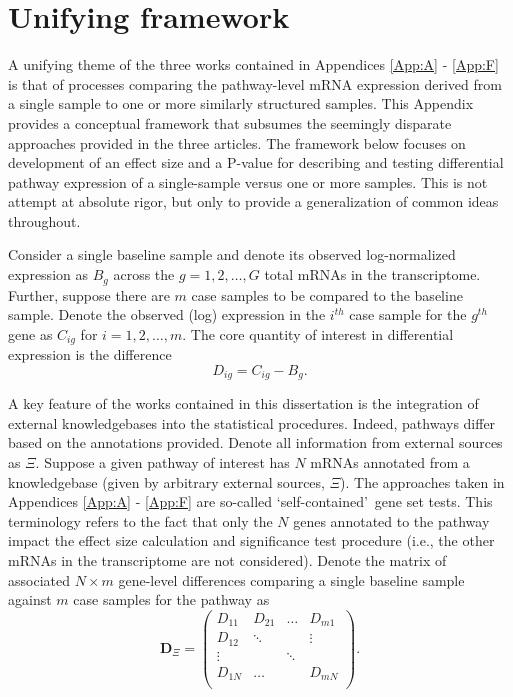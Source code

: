 \chapter{Unifying framework} \label{App:eqns}

\indent \indent A unifying theme of the three works contained in Appendices \ref{App:A} - \ref{App:F} is that of processes comparing the pathway-level mRNA expression derived from a single sample to one or more similarly structured samples. This Appendix provides a conceptual framework that subsumes the seemingly disparate approaches provided in the three articles. The framework below focuses on  development of an effect size and a P-value for describing and testing differential pathway expression of a single-sample versus one or more samples. This is not attempt at absolute rigor, but only to provide a generalization of common ideas throughout.

Consider a single baseline sample and denote its observed log-normalized expression as $B_{g}$ across the $g=1,2,\ldots,G$ total mRNAs in the transcriptome. Further, suppose there are $m$ case samples to be compared to the baseline sample. Denote the observed (log) expression in the $i^{th}$ case sample for the $g^{th}$ gene as $C_{ig}$ for $i=1,2,\ldots,m$. The core quantity of interest in differential expression is the difference
\begin{equation*}
\label{eq:diff}
D_{ig}=C_{ig}-B_{g}. \tag{1}
\end{equation*}

A key feature of the works contained in this dissertation is the integration of external knowledgebases into the statistical procedures. Indeed, pathways differ based on the annotations provided. Denote all information from external sources as $\Xi$. Suppose a given pathway of interest has $N$ mRNAs annotated from a knowledgebase (given by arbitrary external sources, $\Xi$). The approaches taken in Appendices \ref{App:A} - \ref{App:F} are so-called \lq self-contained\rq~gene set tests. This terminology refers to the fact that only the $N$ genes annotated to the pathway impact the effect size calculation and significance test procedure (i.e., the other mRNAs in the transcriptome are not considered). Denote the matrix of associated $N \times m$ gene-level differences comparing a single baseline sample against $m$ case samples for the pathway as
\begin{equation*}
  \label{eq:Dmat}
  \mathbf{D}_{\Xi} = \left ( \begin{array}{rcccc}
    D_{11} & D_{21} & \ldots & D_{m1} \\
    D_{12} & \ddots &  & \vdots \\
    \vdots &  & \ddots &  \\
    D_{1N} & \ldots &  & D_{mN} \\
\end{array} \right ) \tag{2}.
\end{equation*}

